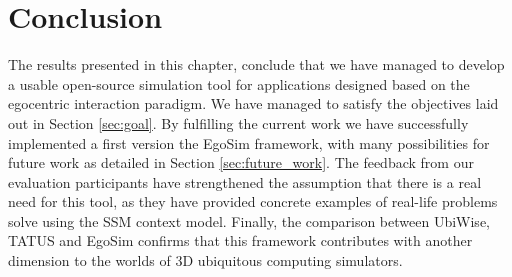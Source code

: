 \section{Conclusion} %
\label{sec:eval_conclusion}
The results presented in this chapter, conclude that we have managed to develop a usable open-source simulation tool for applications designed based on the egocentric interaction paradigm. We have managed to satisfy the objectives laid out in Section \ref{sec:goal}. By fulfilling the current work we have successfully implemented a first version the EgoSim framework, with many possibilities for future work as detailed in Section \ref{sec:future_work}. The feedback from our evaluation participants have strengthened the assumption that there is a real need for this tool, as they have provided concrete examples of real-life problems solve using the SSM context model. Finally, the comparison between UbiWise, TATUS and EgoSim confirms that this framework contributes with another dimension to the worlds of 3D ubiquitous computing simulators.
